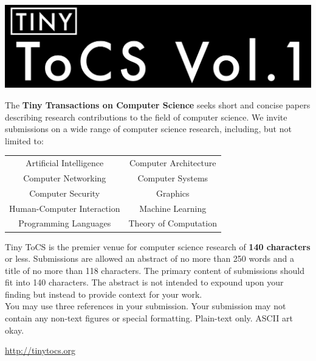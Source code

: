 \documentclass[12pt]{article}
\begin{document}
\baselineskip 24pt

\parindent 0.0cm

\begin{center}
    \includegraphics[width=\textwidth]{ttocs-logo.pdf} \\
    \vspace{0.25in}
    {\rm {} }
\end{center}

\vspace*{0.15in}

\setlength{\fboxrule}{2pt}
\setlength{\fboxsep}{16pt}
\begin{boxedminipage}{\columnwidth}
\begin{large}
The \textbf{Tiny Transactions on Computer Science} seeks short and concise papers describing research contributions to
the field of computer science. We invite submissions on a wide range of computer science research, including, but not
limited to:

\begin{center}
    \begin{tabular}{cc}
        Artificial Intelligence & Computer Architecture \\
        Computer Networking & Computer Systems \\
        Computer Security   & Graphics \\
        Human-Computer Interaction & Machine Learning \\
        Programming Languages & Theory of Computation \\
    \end{tabular} 
\end{center}

Tiny ToCS is the premier venue for computer science research of \textbf{140 characters} or less. Submissions are
allowed an abstract of no more than 250 words and a title of no more than 118 characters. The primary content of
submissions should fit into 140 characters. The abstract is not intended to expound upon your finding but instead to
provide context for your work. \\

You may use three references in your submission. Your submission may not contain any non-text figures or special
formatting. Plain-text only. ASCII art okay. 

\end{large}
\end{boxedminipage}

\begin{center}
    {\rm {}}
    \vspace*{0.25in}
    {\huge \url{http://tinytocs.org}}
\end{center}
\end{document}
